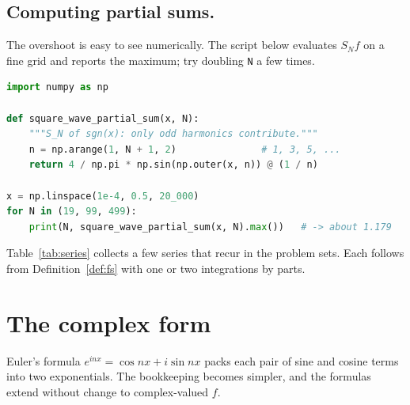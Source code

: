 \documentclass[11pt]{article}
\begin{document}
\subsection{Computing partial sums.}
The overshoot is easy to see numerically. The script below evaluates $S_N f$
on a fine grid and reports the maximum; try doubling \texttt{N} a few times.

\begin{lstlisting}[language=Python]
import numpy as np

def square_wave_partial_sum(x, N):
    """S_N of sgn(x): only odd harmonics contribute."""
    n = np.arange(1, N + 1, 2)               # 1, 3, 5, ...
    return 4 / np.pi * np.sin(np.outer(x, n)) @ (1 / n)

x = np.linspace(1e-4, 0.5, 20_000)
for N in (19, 99, 499):
    print(N, square_wave_partial_sum(x, N).max())   # -> about 1.179
\end{lstlisting}

Table~\ref{tab:series} collects a few series that recur in the problem sets. Each
follows from Definition~\ref{def:fs} with one or two integrations by parts.

\begin{table}[!h]
\end{table}

\section{The complex form}

Euler's formula $e^{inx}=\cos nx + i\sin nx$ packs each pair of sine and
cosine terms into two exponentials. The bookkeeping becomes simpler, and the
formulas extend without change to complex-valued $f$.
\end{document}
